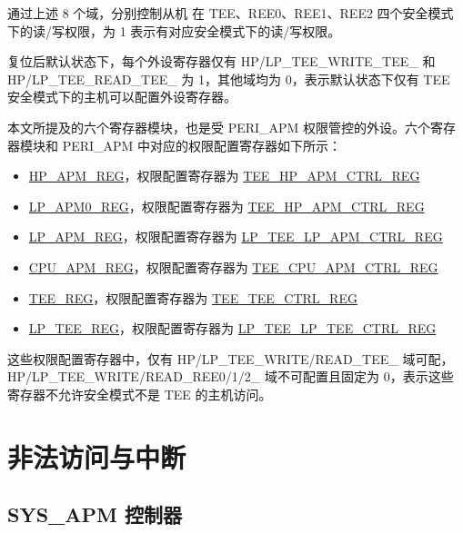 \documentclass[main\_\_CN.tex]{subfiles}
\begin{document}
通过上述 8 个域，分别控制从机  在 TEE、REE0、REE1、REE2 四个安全模式下的读/写权限，为 1 表示有对应安全模式下的读/写权限。

复位后默认状态下，每个外设寄存器仅有 HP/LP\_TEE\_WRITE\_TEE\_ 和 HP/LP\_TEE\_READ\_TEE\_ 为 1，其他域均为 0，表示默认状态下仅有 TEE 安全模式下的主机可以配置外设寄存器。

本文所提及的六个寄存器模块，也是受 PERI\_APM 权限管控的外设。六个寄存器模块和 PERI\_APM 中对应的权限配置寄存器如下所示：
\begin{itemize}
    \item \hyperref[sec:permctrl-reg-hp]{HP\_APM\_REG}，权限配置寄存器为 \hyperref[regdesc:TEEHPAPMCTRLREG]{TEE\_HP\_APM\_CTRL\_REG}

    \item \hyperref[sec:permctrl-reg-lp0]{LP\_APM0\_REG}，权限配置寄存器为 \hyperref[regdesc:TEEHPAPMCTRLREG]{TEE\_HP\_APM\_CTRL\_REG}

    \item \hyperref[sec:permctrl-reg-lp]{LP\_APM\_REG}，权限配置寄存器为 \hyperref[regdesc:LPTEELPAPMCTRLREG]{LP\_TEE\_LP\_APM\_CTRL\_REG}

    \item \hyperref[sec:permctrl-reg-cpu]{CPU\_APM\_REG}，权限配置寄存器为 \hyperref[regdesc:TEECPUAPMCTRLREG]{TEE\_CPU\_APM\_CTRL\_REG}

    \item \hyperref[sec:permctrl-reg-hp-tee]{TEE\_REG}，权限配置寄存器为  \hyperref[regdesc:TEETEECTRLREG]{TEE\_TEE\_CTRL\_REG}

    \item \hyperref[sec:permctrl-reg-lp-tee]{LP\_TEE\_REG}，权限配置寄存器为 \hyperref[regdesc:LPTEELPTEECTRLREG]{LP\_TEE\_LP\_TEE\_CTRL\_REG}
\end{itemize}

这些权限配置寄存器中，仅有 HP/LP\_TEE\_{WRITE/READ}\_TEE\_ 域可配，HP/LP\_TEE\_{WRITE/READ}\_REE{0/1/2}\_ 域不可配置且固定为 0，表示这些寄存器不允许安全模式不是 TEE 的主机访问。

\section{非法访问与中断}

\subsection{SYS\_APM 控制器}
\end{document}
